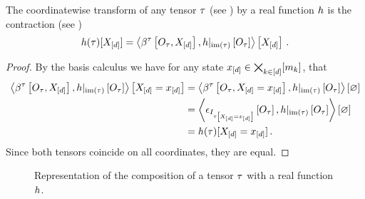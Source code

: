 \begin{theorem}
    \label{the:tensorFunctionComposition}
    The coordinatewise transform of any tensor $\tau$ (see ) by a real function $h$ is the contraction (see )
    \begin{align*}
        h(\tau)[X_{[d]}]
        = \left\langle \beta^{\tau}\left[O_{\tau},X_{[d]}\right],{h}|_{\mathrm{im}\left(\tau\right)}\left[O_{\tau}\right] \right\rangle \left[ X_{[d]} \right] \, .
    \end{align*}
\end{theorem}
\begin{proof}
    By the basis calculus  we have for any state $x_{[d]}\in\bigtimes_{k\in[d]}[m_{k}]$, that
    \begin{align*}
        \left\langle \beta^{\tau}\left[O_{\tau},X_{[d]}\right],{h}|_{\mathrm{im}\left(\tau\right)}\left[O_{\tau}\right]\right\rangle \left[ X_{[d]}=x_{[d]} \right]
        &= \left\langle \beta^{\tau}\left[O_{\tau},X_{[d]}=x_{[d]}\right],{h}|_{\mathrm{im}\left(\tau\right)}\left[O_{\tau}\right]\right\rangle \left[ \varnothing \right] \\
        & = \left\langle \epsilon_{I_{\tau\left[X_{[d]}=x_{[d]}\right]}}\left[O_{\tau}\right],{h}|_{\mathrm{im}\left(\tau\right)}\left[O_{\tau}\right]\right\rangle \left[ \varnothing \right] \\
        & = h(\tau)[X_{[d]}=x_{[d]}] \, .
    \end{align*}
    Since both tensors coincide on all coordinates, they are equal.
\end{proof}

\begin{figure}[h]
    \begin{center}
        
    \end{center}
    \caption{Representation of the composition of a tensor $\tau$ with a real function $h$.}
    \label{fig:tensorFunctionComposition}
\end{figure}


